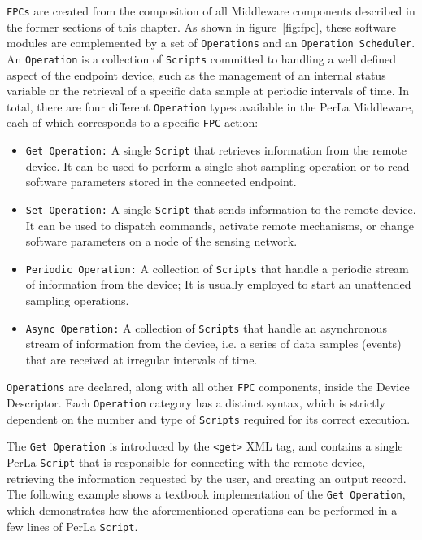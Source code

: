 \texttt{FPCs} are created from the composition of all Middleware components
described in the former sections of this chapter. As shown in
figure~\ref{fig:fpc}, these software modules are complemented by a set of
\texttt{Operations} and an \texttt{Operation Scheduler}. An \texttt{Operation}
is a collection of \texttt{Scripts} committed to handling a well defined aspect
of the endpoint device, such as the management of an internal status variable
or the retrieval of a specific data sample at periodic intervals of time. In
total, there are four different \texttt{Operation} types available in the PerLa
Middleware, each of which corresponds to a specific \texttt{FPC} action:

\begin{itemize}

    \item \texttt{Get Operation:} A single \texttt{Script} that retrieves
        information from the remote device. It can be used to perform a
        single-shot sampling operation or to read software parameters stored in
        the connected endpoint.

    \item \texttt{Set Operation:} A single \texttt{Script} that sends
        information to the remote device. It can be used to dispatch commands,
        activate remote mechanisms, or change software parameters on a node of
        the sensing network.

    \item \texttt{Periodic Operation:} A collection of \texttt{Scripts} that
        handle a periodic stream of information from the device; It is usually
        employed to start an unattended sampling operations.

    \item \texttt{Async Operation:} A collection of \texttt{Scripts} that
        handle an asynchronous stream of information from the device, i.e. a
        series of data samples (events) that are received at irregular
        intervals of time.

\end{itemize}

\texttt{Operations} are declared, along with all other \texttt{FPC} components,
inside the Device Descriptor. Each \texttt{Operation} category has a distinct
syntax, which is strictly dependent on the number and type of \texttt{Scripts}
required for its correct execution. 

The \texttt{Get Operation} is introduced by the \lstinline!<get>! XML tag, and
contains a single PerLa \texttt{Script} that is responsible for connecting with
the remote device, retrieving the information requested by the user, and
creating an output record. The following example shows a textbook
implementation of the \texttt{Get Operation}, which demonstrates how the
aforementioned operations can be performed in a few lines of PerLa
\texttt{Script}.

